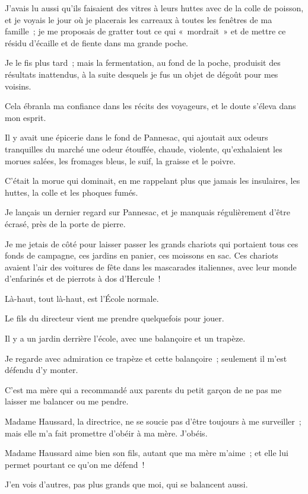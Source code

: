 \documentclass[french,twoside]{book} %
\begin{document}
J’avais lu aussi qu’ils faisaient des vitres à leurs huttes avec de la colle de poisson, et je voyais le jour où je placerais les carreaux à toutes les fenêtres de ma famille ; je me proposais de gratter tout ce qui « mordrait » et de mettre ce résidu d’écaille et de fiente dans ma grande poche.\par
Je le fis plus tard ; mais la fermentation, au fond de la poche, produisit des résultats inattendus, à la suite desquels je fus un objet de dégoût pour mes voisins.\par
Cela ébranla ma confiance dans les récits des voyageurs, et le doute s’éleva dans mon esprit.\par
Il y avait une épicerie dans le fond de Pannesac, qui ajoutait aux odeurs tranquilles du marché une odeur étouffée, chaude, violente, qu’exhalaient les morues salées, les fromages bleus, le suif, la graisse et le poivre.\par
C’était la morue qui dominait, en me rappelant plus que jamais les insulaires, les huttes, la colle et les phoques fumés.\par
Je lançais un dernier regard sur Pannesac, et je manquais régulièrement d’être écrasé, près de la porte de pierre.\par
Je me jetais de côté pour laisser passer les grands chariots qui portaient tous ces fonds de campagne, ces jardins en panier, ces moissons en sac. Ces chariots avaient l’air des voitures de fête dans les mascarades italiennes, avec leur monde d’enfarinés et de pierrots à dos d’Hercule !\par
\bigbreak
\noindent Là-haut, tout là-haut, est l’École normale.\par
\bigbreak
\noindent Le fils du directeur vient me prendre quelquefois pour jouer.\par
Il y a un jardin derrière l’école, avec une balançoire et un trapèze.\par
Je regarde avec admiration ce trapèze et cette balançoire ; seulement il m’est défendu d’y monter.\par
C’est ma mère qui a recommandé aux parents du petit garçon de ne pas me laisser me balancer ou me pendre.\par
Madame Haussard, la directrice, ne se soucie pas d’être toujours à me surveiller ; mais elle m’a fait promettre d’obéir à ma mère. J’obéis.\par
Madame Haussard aime bien son fils, autant que ma mère m’aime ; et elle lui permet pourtant ce qu’on me défend !\par
J’en vois d’autres, pas plus grands que moi, qui se balancent aussi.\par
\end{document}
